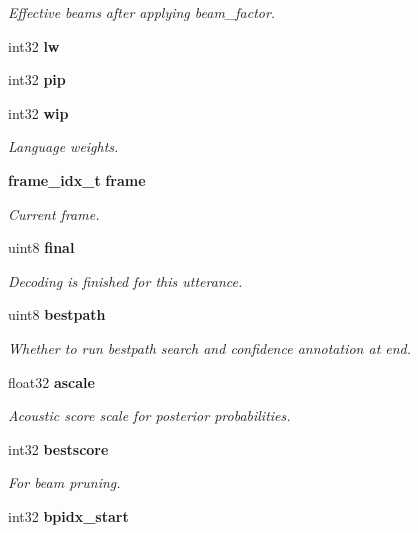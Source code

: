 \begin{DoxyCompactItemize}
\begin{DoxyCompactList}\small\item\em Effective beams after applying beam\-\_\-factor. \end{DoxyCompactList}\item 
int32 {\bfseries lw}\label{structfsg__search__s_a77c1f7f228ca66e48fb05e1ac2b2714a}

\item 
int32 {\bfseries pip}\label{structfsg__search__s_a2163d2c02c2dfe84a83c10fdb2d330a3}

\item 
int32 {\bf wip}\label{structfsg__search__s_ae9ddc3b50d0f164926392f8ab4b019a0}

\begin{DoxyCompactList}\small\item\em Language weights. \end{DoxyCompactList}\item 
{\bf frame\-\_\-idx\-\_\-t} {\bf frame}
\begin{DoxyCompactList}\small\item\em Current frame. \end{DoxyCompactList}\item 
uint8 {\bf final}
\begin{DoxyCompactList}\small\item\em Decoding is finished for this utterance. \end{DoxyCompactList}\item 
uint8 {\bf bestpath}
\begin{DoxyCompactList}\small\item\em Whether to run bestpath search and confidence annotation at end. \end{DoxyCompactList}\item 
float32 {\bf ascale}
\begin{DoxyCompactList}\small\item\em Acoustic score scale for posterior probabilities. \end{DoxyCompactList}\item 
int32 {\bf bestscore}\label{structfsg__search__s_a52880ad440412d76f7aae7e05977ba4b}

\begin{DoxyCompactList}\small\item\em For beam pruning. \end{DoxyCompactList}\item 
int32 {\bf bpidx\-\_\-start}\label{structfsg__search__s_a24d59609008ac132dca256d36a89f9c8}


\end{DoxyCompactItemize}
